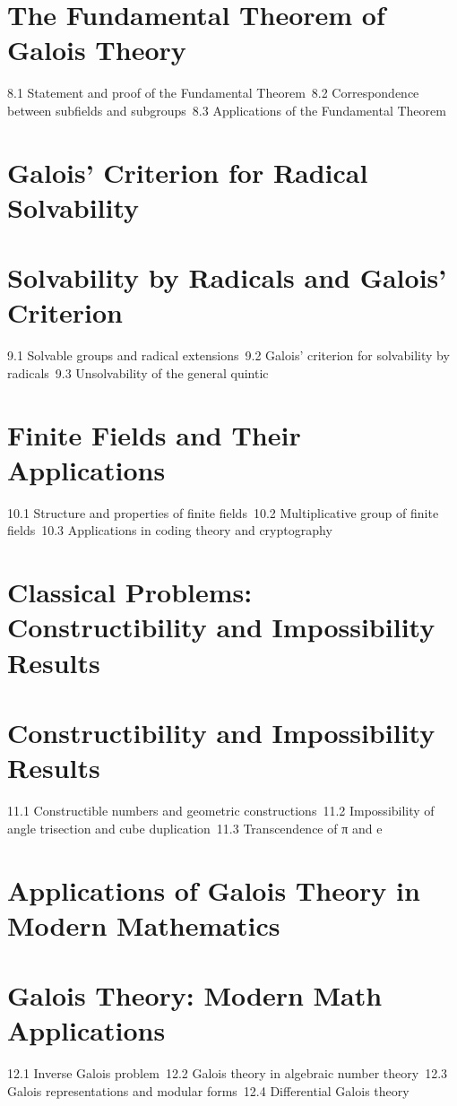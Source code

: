 \section{The Fundamental Theorem of Galois Theory}
8.1 Statement and proof of the Fundamental Theorem\
8.2 Correspondence between subfields and subgroups\
8.3 Applications of the Fundamental Theorem\
\section{Galois' Criterion for Radical Solvability}
\section{Solvability by Radicals and Galois' Criterion}
9.1 Solvable groups and radical extensions\
9.2 Galois' criterion for solvability by radicals\
9.3 Unsolvability of the general quintic\
\section{Finite Fields and Their Applications}
10.1 Structure and properties of finite fields\
10.2 Multiplicative group of finite fields\
10.3 Applications in coding theory and cryptography\
\section{Classical Problems: Constructibility and Impossibility Results}
\section{Constructibility and Impossibility Results}
11.1 Constructible numbers and geometric constructions\
11.2 Impossibility of angle trisection and cube duplication\
11.3 Transcendence of π and e\
\section{Applications of Galois Theory in Modern Mathematics}
\section{Galois Theory: Modern Math Applications}
12.1 Inverse Galois problem\
12.2 Galois theory in algebraic number theory\
12.3 Galois representations and modular forms\
12.4 Differential Galois theory\
